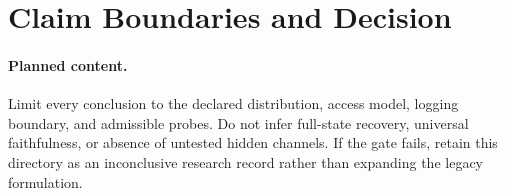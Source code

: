 \section{Claim Boundaries and Decision}
\label{sec:claim-boundaries}

\paragraph{Planned content.}
Limit every conclusion to the declared distribution, access model, logging
boundary, and admissible probes. Do not infer full-state recovery, universal
faithfulness, or absence of untested hidden channels. If the gate fails, retain
this directory as an inconclusive research record rather than expanding the
legacy formulation.
